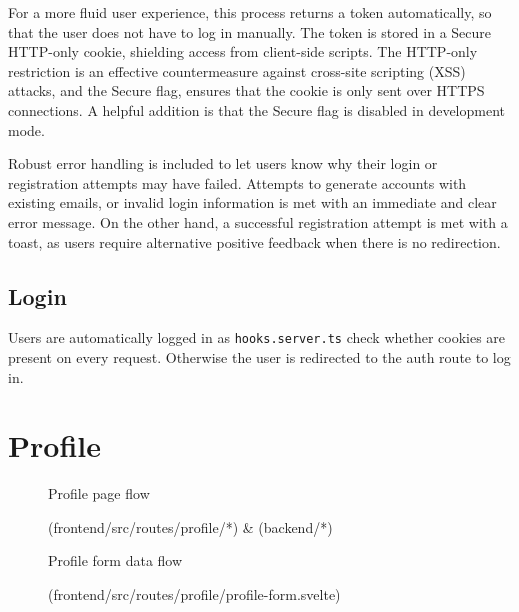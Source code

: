 For a more fluid user experience, this process returns a token automatically, so that the user does not have to log in manually. The token is stored in a Secure HTTP-only cookie, shielding access from client-side scripts. The HTTP-only restriction is an effective countermeasure against cross-site scripting (XSS) attacks, and the Secure flag, ensures that the cookie is only sent over HTTPS connections. A helpful addition is that the Secure flag is disabled in development mode.

Robust error handling is included to let users know why their login or registration attempts may have failed. Attempts to generate accounts with existing emails, or invalid login information is met with an immediate and clear error message. On the other hand, a successful registration attempt is met with a toast, as users require alternative positive feedback when there is no redirection.
\subsection{Login}

Users are automatically logged in as \texttt{hooks.server.ts} check whether cookies are present on every request. Otherwise the user is redirected to the auth route to log in.

\section{Profile}
\begin{figure}[h]
\centering
{}
\vspace{-20pt}
\caption{Profile page flow}
\vspace{-10pt}
\caption*{(frontend/src/routes/profile/*) \& (backend/*)}
\label{fig:profile-file-flow}
\vspace{-5pt}
\end{figure}


\begin{figure}[h]
\centering
{}
\vspace{-5pt}
\caption{Profile form data flow}
\vspace{-10pt}
\caption*{(frontend/src/routes/profile/profile-form.svelte)}
\label{fig:profile-form}
\vspace{-5pt}
\end{figure}

